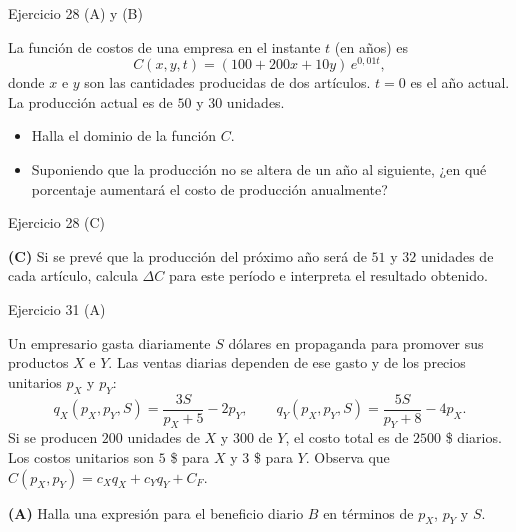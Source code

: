 \documentclass[aspectratio=169]{beamer}
\begin{document}
\begin{frame}{Ejercicio 28 (A) y (B)}
  \begin{mwejercicio}
    La función de costos de una empresa en el instante \(t\) (en años) es
    \[
      C(x,y,t)=(100+200x+10y)\,e^{0{,}01t},
    \]
    donde \(x\) e \(y\) son las cantidades producidas de dos artículos. \(t=0\)
    es el año actual. La producción actual es de \(50\) y \(30\) unidades.
    \begin{itemize}
      \item[\textbf{(A)}] Halla el dominio de la función \(C\).
      \item[\textbf{(B)}] Suponiendo que la producción no se altera de un año al
      siguiente, ¿en qué porcentaje aumentará el costo de producción anualmente?
    \end{itemize}
  \end{mwejercicio}
\end{frame}

\begin{frame}{Ejercicio 28 (C)}
  \begin{mwejercicio}
    \textbf{(C)} Si se prevé que la producción del próximo año será de \(51\) y
    \(32\) unidades de cada artículo, calcula \(\Delta C\) para este período e
    interpreta el resultado obtenido.
  \end{mwejercicio}
\end{frame}

\begin{frame}{Ejercicio 31 (A)}
  \begin{mwejercicio}
    Un empresario gasta diariamente \(S\) dólares en propaganda para promover
    sus productos \(X\) e \(Y\). Las ventas diarias dependen de ese gasto y de
    los precios unitarios \(p_X\) y \(p_Y\):
    \[
      q_X(p_X,p_Y,S)=\frac{3S}{p_X+5}-2p_Y,
      \qquad
      q_Y(p_X,p_Y,S)=\frac{5S}{p_Y+8}-4p_X.
    \]
    Si se producen \(200\) unidades de \(X\) y \(300\) de \(Y\), el costo total
    es de \(2500\) \$ diarios. Los costos unitarios son \(5\) \$ para \(X\) y
    \(3\) \$ para \(Y\). Observa que
    \(C(p_X,p_Y)=c_Xq_X+c_Yq_Y+C_F\).

    \textbf{(A)} Halla una expresión para el beneficio diario \(B\) en términos
    de \(p_X\), \(p_Y\) y \(S\).
  \end{mwejercicio}
\end{frame}
\end{document}
